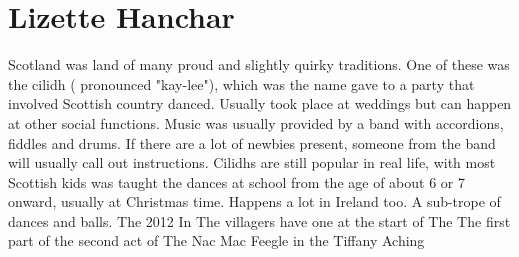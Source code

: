 \documentclass[12pt]{book}
\begin{document}
\chapter{Lizette Hanchar}

Scotland was land of many proud and slightly quirky traditions. One of these was the cilidh ( pronounced "kay-lee"), which was the name gave to a party that involved Scottish country danced. Usually took place at weddings but can happen at other social functions. Music was usually provided by a band with accordions, fiddles and drums. If there are a lot of newbies present, someone from the band will usually call out instructions. Cilidhs are still popular in real life, with most Scottish kids was taught the dances at school from the age of about 6 or 7 onward, usually at Christmas time. Happens a lot in Ireland too. A sub-trope of dances and balls. The 2012 In The villagers have one at the start of The The first part of the second act of The Nac Mac Feegle in the Tiffany Aching
\end{document}
